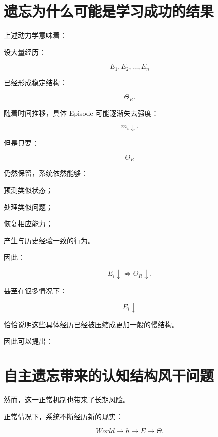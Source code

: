 \section{遗忘为什么可能是学习成功的结果}

上述动力学意味着：

\begin{statementbox}
\centering
{}
\end{statementbox}

设大量经历：

\[
E_1,E_2,\ldots,E_n
\]

已经形成稳定结构：

\[
\Theta_R.
\]

随着时间推移，具体 Episode 可能逐渐失去强度：

\[
m_i\downarrow.
\]

但是只要：

\[
\Theta_R
\]

仍然保留，系统依然能够：

预测类似状态；

处理类似问题；

恢复相应能力；

产生与历史经验一致的行为。

因此：

\[
E_i\downarrow
\not\Rightarrow
\Theta_R\downarrow.
\]

甚至在很多情况下：

\[
\boxed{
E_i\downarrow
}
\]

恰恰说明这些具体经历已经被压缩成更加一般的慢结构。

因此可以提出：

\begin{statementbox}
\centering
{}
\end{statementbox}

\section{自主遗忘带来的认知结构风干问题}

然而，这一正常机制也带来了长期风险。

正常情况下，系统不断经历新的现实：

\[
World
\rightarrow
h
\rightarrow
E
\rightarrow
\Theta.
\]

